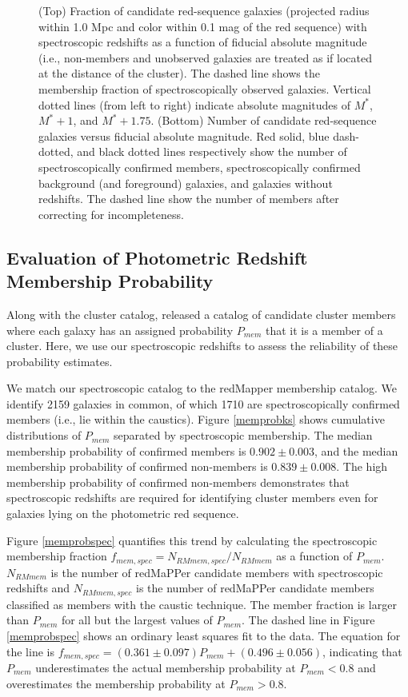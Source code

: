 \begin{figure} 
\caption{\label{speccomp} (Top) Fraction of candidate red-sequence galaxies (projected radius within 1.0 Mpc and color within 0.1 mag of the red sequence) with spectroscopic redshifts as a function of fiducial absolute magnitude (i.e., non-members and unobserved galaxies are treated as if located at the distance of the cluster).
The dashed line shows the membership fraction of spectroscopically observed galaxies. 
Vertical dotted lines (from left to right) indicate absolute magnitudes of $M^*$, $M^*+1$, and $M^*+1.75$.
(Bottom) Number of candidate red-sequence galaxies  versus fiducial absolute magnitude.  Red solid, blue dash-dotted, and black dotted lines respectively show the number of spectroscopically confirmed members, spectroscopically confirmed background (and foreground) galaxies, and galaxies without redshifts.  The dashed line show the number of members after correcting for incompleteness. 
  }
\end{figure}


\subsection{\label{memprobeval} Evaluation of Photometric Redshift Membership Probability }

Along with the cluster catalog, \citet{rykoff14} released a catalog of candidate cluster members 
where each galaxy has an assigned probability $P_{mem}$ that it is a member of a cluster.  
Here, we use our spectroscopic redshifts to assess the reliability of these probability estimates.

We match our spectroscopic catalog to the redMapper membership catalog.  We identify 2159 
galaxies in common, of which 1710 are spectroscopically confirmed members (i.e., lie within 
the caustics).  Figure \ref{memprobks} shows cumulative distributions of $P_{mem}$ separated
by spectroscopic membership.  The median membership probability of confirmed members is 
$0.902\pm0.003$, and the median membership probability of confirmed non-members is 
$0.839\pm0.008$.  The high membership probability of confirmed non-members demonstrates 
that spectroscopic redshifts are required for identifying cluster members even for galaxies 
lying on the photometric red sequence. 

Figure \ref{memprobspec} quantifies this trend by calculating the spectroscopic membership 
fraction $f_{mem,spec} = N_{RMmem,spec}/N_{RMmem}$ as a function of $P_{mem}$. 
$N_{RMmem}$ is the number of redMaPPer candidate members with spectroscopic 
redshifts and $N_{RMmem,spec}$ is the number of redMaPPer 
candidate members classified as members with the caustic technique.  The member fraction 
is larger than $P_{mem}$ for all but the largest values of $P_{mem}$.   The dashed line in 
Figure \ref{memprobspec} shows an ordinary least squares fit to the data.  The equation for 
the line is $f_{mem,spec} = (0.361\pm0.097)P_{mem} + (0.496\pm0.056)$, indicating that 
$P_{mem}$ underestimates the actual membership probability at $P_{mem}<0.8$ and 
overestimates the membership probability at $P_{mem}>0.8$.

